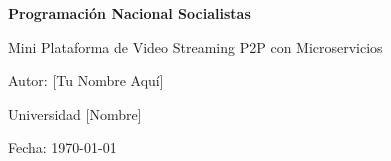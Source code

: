 \begin{titlepage}
    \centering
    \vspace*{3cm}
    {\Huge\bfseries Programación Nacional Socialistas \par}
    \vspace{2cm}
    {\Large Mini Plataforma de Video Streaming P2P con Microservicios\par}
    \vspace{3cm}
    {\large Autor: [Tu Nombre Aquí]\par}
    \vfill
    {\large Universidad [Nombre]\par}
    {\large Fecha: \today\par}
\end{titlepage}
